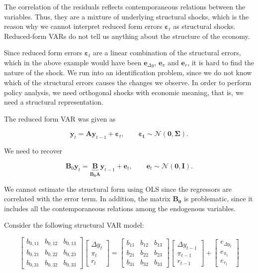 The correlation of the residuals reflects contemporaneous relations between the variables. Thus, they are a mixture of underlying structural shocks, which is the reason why we cannot interpret reduced form errors $\bm{\varepsilon}_t$ as structural shocks. Reduced-form VARs do not tell us anything about the structure of the economy.

Since reduced form errors $\bm{\varepsilon}_t$ are a linear combination of the structural errors, which in the above example would have been $\bm{e}_{\Delta y}$, $\bm{e}_\pi$ and $\bm{e}_r$, it is hard to find the nature of the shock. We run into an identification problem, since we do not know which of the structural errors causes the changes we observe. In order to perform policy analysis, we need orthogonal shocks with economic meaning, that is, we need a structural representation.

The reduced form VAR was given as

\[
	\bm{y}_t = \bm{Ay}_{t-1} + \bm{\varepsilon}_t, \qquad \bm{\varepsilon_t}\sim\mathcal{N}(\bm{0},\bm{\Sigma}).
\]

We need to recover

\[
	\bm{B}_0\bm{y}_t = \underbrace{\bm{B}}_{\bm{B_0A}}\bm{y}_{t-1}+\bm{e}_t, \qquad \bm{e}_t \sim \mathcal{N}(\bm{0},\bm{I}).
\]

We cannot estimate the structural form using OLS since the regressors are correlated with the error term. In addition, the matrix $\bm{B_0}$ is problematic, since it includes all the contemporaneous relations among the endogenous variables. 

Consider the following structural VAR model:

\[
\left[\begin{array}{lll}
b_{0,11} & b_{0,12} & b_{0,13} \\
b_{0,21} & b_{0,22} & b_{0,23} \\
b_{0,31} & b_{0,32} & b_{0,33}
\end{array}\right]\left[\begin{array}{c}
\Delta y_t \\
\pi_t \\
r_t
\end{array}\right]=\left[\begin{array}{lll}
b_{11} & b_{12} & b_{13} \\
b_{21} & b_{22} & b_{23} \\
b_{31} & b_{32} & b_{33}
\end{array}\right]\left[\begin{array}{c}
\Delta y_{t-1} \\
\pi_{t-1} \\
r_{t-1}
\end{array}\right]+\left[\begin{array}{c}
e_{\Delta y_t} \\
e_{\pi_t} \\
e_{r_t}
\end{array}\right]
\]

